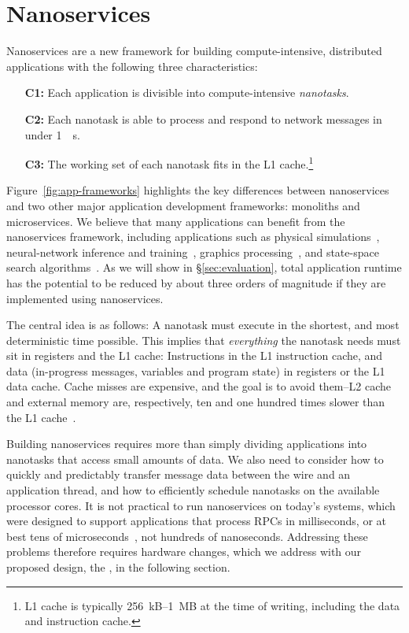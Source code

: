 \section{Nanoservices}
\label{sec:nanoservices}
Nanoservices are a new framework for building compute-intensive, distributed applications with the following three characteristics:

\vspace{0.5pt}
\begin{itemize}
    \item[\bf C1:] Each application is divisible into compute-intensive {\em nanotasks}.
    \item[\bf C2:] Each nanotask is able to process and respond to network messages in under \SI{1}{\mu s}.
    \item[\bf C3:] The working set of each nanotask fits in the L1 cache.\footnote{L1 cache is typically \SI{256}{kB}--\SI{1}{MB} at the time of writing, including the data and instruction cache.}
\end{itemize}
\vspace{0.5pt}

Figure~\ref{fig:app-frameworks} highlights the key differences between nanoservices and two other major application development frameworks: monoliths and microservices.
We believe that many applications can benefit from the nanoservices framework, including applications such as physical simulations~\cite{barnes-hut, molecular-dynamics}, neural-network inference and training~\cite{tensorflow}, graphics processing~\cite{ray-tracing}, and state-space search algorithms~\cite{state-space-search}.
As we will show in \S\ref{sec:evaluation}, total application runtime has the potential to be reduced by about three orders of magnitude if they are implemented using nanoservices.

The central idea is as follows: A nanotask must execute in the shortest, and most deterministic time possible. 
This implies that {\em everything} the nanotask needs must sit in registers and the L1 cache: Instructions in the L1 instruction cache, and data (in-progress messages, variables and program state) in registers or the L1 data cache. 
Cache misses are expensive, and the goal is to avoid them--L2 cache and external memory are, respectively, ten and one hundred times slower than the L1 cache~\cite{jeff-dean-numbers}.

Building nanoservices requires more than simply dividing applications into nanotasks that access small amounts of data.
We also need to consider how to quickly and predictably transfer message data between the wire and an application thread, and how to efficiently schedule nanotasks on the available processor cores.
It is not practical to run nanoservices on today's systems, which were designed to support applications that process RPCs in milliseconds, or at best tens of microseconds~\cite{eRPC, perfkit-grpc}, not hundreds of nanoseconds.
Addressing these problems therefore requires hardware changes, which we address with our proposed design, the \name{}, in the following section.

